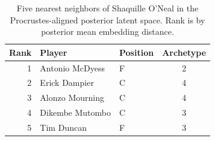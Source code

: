 \begin{table}[htbp]
  \centering\small
  \begin{tabular}{rllc}
    \toprule
    Rank & Player & Position & Archetype \\
    \midrule
    1 & Antonio McDyess & F & 2 \\
    2 & Erick Dampier & C & 4 \\
    3 & Alonzo Mourning & C & 4 \\
    4 & Dikembe Mutombo & C & 3 \\
    5 & Tim Duncan & F & 3 \\
    \bottomrule
  \end{tabular}
  \caption{Five nearest neighbors of Shaquille O'Neal in the Procrustes-aligned posterior latent space. Rank is by posterior mean embedding distance.}
  \label{tab:Shaquille_O_Neal_neighbors}
\end{table}

